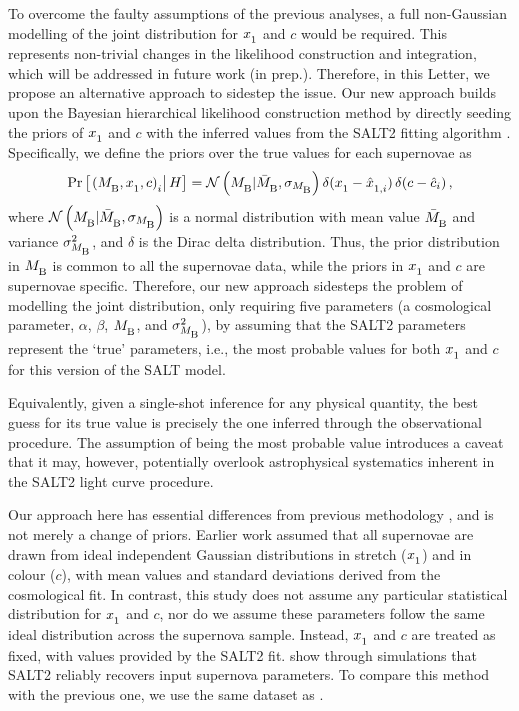 \documentclass[fleqn,usenatbib,onecolumn,referee]{mnras}
\newcommand{\prior}{\mathrm{Pr}}
\newcommand{\Z}[1]{_{\lower2pt\hbox{$\scriptstyle#1$}}}
\newcommand{\Ns}[1]{_{\lower2pt\hbox{$\scriptstyle\rm#1$}}}
\begin{document}
To overcome the faulty assumptions of the previous analyses, a full non-Gaussian modelling of the joint distribution for $x\Z1$ and $c$ would be required. This represents non-trivial changes in the likelihood construction and integration, which will be addressed in future work (in prep.).
Therefore, in this Letter, we propose an alternative approach to sidestep the issue. Our new approach builds upon the Bayesian hierarchical likelihood construction method by directly seeding the priors of $x\Z1$ and $c$ with the inferred values from the SALT2 fitting algorithm \citep{Guy_2005, Guy_2007, Taylor_2021}. Specifically, we define the priors over the true values for each supernovae as 
\begin{equation}
    \prior\left[\left.(M\Ns{B}, x\Z 1, c) \Z i \right| H\right] = \mathcal{N}\left(M\Ns{B}|\bar{M}\Ns{B},\sigma_{M\Ns{B}}\right)\delta(x\Z 1-\hat{x}\Z {1,i})\,\delta(c-\hat{c}_{i}) \, ,
\end{equation}
where $\mathcal{N}\left(M\Ns{B}|\bar{M}\Ns{B},\sigma_{M\Ns{B}}\right)$ is a normal distribution with mean value $\bar{M}\Ns{B}$ and variance $\sigma_{M\Ns{B}}^2$, and $\delta$ is the Dirac delta distribution. Thus, the prior distribution in $M\Ns{B}$ is common to all the supernovae data, while the priors in $x\Z1$ and $c$ are supernovae specific. Therefore, our new approach sidesteps the problem of modelling the joint distribution, only requiring five parameters (a cosmological parameter, $\alpha$, $\beta$, $M\Ns B$, and $\sigma^2_{M\Ns B}$), by assuming that the SALT2 parameters represent the `true' parameters, i.e., the most probable values for both $x \Z 1$ and $c$ for this version of the SALT model.

Equivalently, given a single-shot inference for any physical quantity, the best guess for its true value is precisely the one inferred through the observational procedure. The assumption of being the most probable value introduces a caveat that it may, however, potentially overlook astrophysical systematics inherent in the SALT2 light curve procedure.

Our approach here has essential differences from previous methodology \citep{Nielsen_2016, Dam_2017, Lane_2023}, and is not merely a change of priors. Earlier work assumed that all supernovae are drawn from ideal independent Gaussian distributions in stretch ($x\Z 1$) and in colour ($c$), with mean values and standard deviations derived from the cosmological fit. In contrast, this study does not assume any particular statistical distribution for $x\Z 1$ and $c$, nor do we assume these parameters follow the same ideal distribution across the supernova sample. Instead, $x\Z 1$ and $c$ are treated as fixed, with values provided by the SALT2 fit. \citet{Taylor_2021} show through simulations that SALT2 reliably recovers input supernova parameters. To compare this method with the previous one, we use the same dataset as \citet{Lane_2023}.
\end{document}
